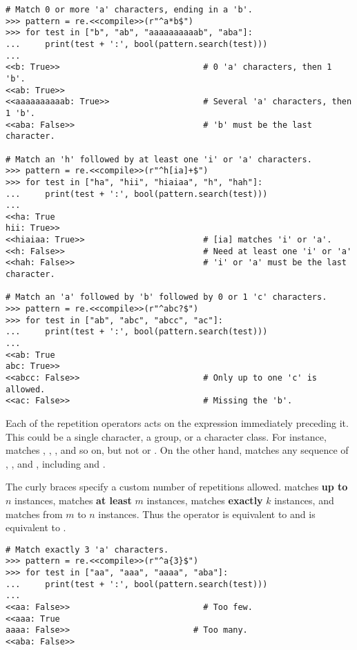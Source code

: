 \begin{lstlisting}
# Match 0 or more 'a' characters, ending in a 'b'.
>>> pattern = re.<<compile>>(r"^a*b$")
>>> for test in ["b", "ab", "aaaaaaaaaab", "aba"]:
...     print(test + ':', bool(pattern.search(test)))
...
<<b: True>>                             # 0 'a' characters, then 1 'b'.
<<ab: True>>
<<aaaaaaaaaab: True>>                   # Several 'a' characters, then 1 'b'.
<<aba: False>>                          # 'b' must be the last character.

# Match an 'h' followed by at least one 'i' or 'a' characters.
>>> pattern = re.<<compile>>(r"^h[ia]+$")
>>> for test in ["ha", "hii", "hiaiaa", "h", "hah"]:
...     print(test + ':', bool(pattern.search(test)))
...
<<ha: True
hii: True>>
<<hiaiaa: True>>                        # [ia] matches 'i' or 'a'.
<<h: False>>                            # Need at least one 'i' or 'a'
<<hah: False>>                          # 'i' or 'a' must be the last character.

# Match an 'a' followed by 'b' followed by 0 or 1 'c' characters.
>>> pattern = re.<<compile>>(r"^abc?$")
>>> for test in ["ab", "abc", "abcc", "ac"]:
...     print(test + ':', bool(pattern.search(test)))
...
<<ab: True
abc: True>>
<<abcc: False>>                         # Only up to one 'c' is allowed.
<<ac: False>>                           # Missing the 'b'.
\end{lstlisting}

Each of the repetition operators acts on the expression immediately preceding it.
This could be a single character, a group, or a character class.
For instance,  matches , , , and so on, but not  or .
On the other hand, \li{[abc]*} matches any sequence of , , and , including  and .

The curly braces \li{\{\}} specify a custom number of repetitions allowed.
 matches \textbf{up to} $n$ instances,  matches \textbf{at least} $m$ instances,  matches \textbf{exactly} $k$ instances, and  matches from $m$ to $n$ instances.
Thus the  operator is equivalent to  and \li{+} is equivalent to .

\begin{lstlisting}
# Match exactly 3 'a' characters.
>>> pattern = re.<<compile>>(r"^a{3}$")
>>> for test in ["aa", "aaa", "aaaa", "aba"]:
...     print(test + ':', bool(pattern.search(test)))
...
<<aa: False>>                           # Too few.
<<aaa: True
aaaa: False>>                         # Too many.
<<aba: False>>
\end{lstlisting}

